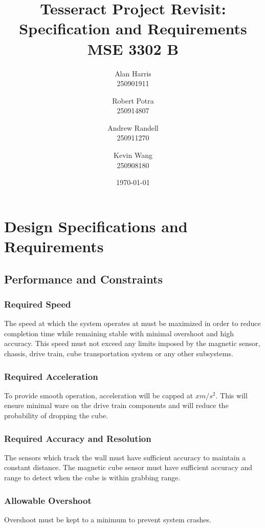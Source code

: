 \documentclass[12pt]{article}
\begin{document}
\title{\textbf{Tesseract Project Revisit:\\Specification and Requirements\\ MSE 3302 B}}
\author{
  Alan Harris\\
  250901911
  \and
  Robert Potra\\
  250914807
  \and
  Andrew Randell\\
  250911270
  \and
  Kevin Wang\\
  250908180
}
\date{\today}
\maketitle

\tableofcontents
\thispagestyle{empty}

\pagebreak
\setcounter{page}{1}
 
\section{Design Specifications and Requirements}
\subsection{Performance and Constraints}
\subsubsection{Required Speed}
The speed at which the system operates at must be maximized in order to reduce completion time while remaining stable with minimal overshoot and high accuracy. This speed must not exceed any limits imposed by the magnetic sensor, chassis, drive train, cube transportation system or any other subsystems.
\subsubsection{Required Acceleration}
To provide smooth operation, acceleration will be capped at $x m/s^2$. This will ensure minimal ware on the drive train components and will reduce the probability of dropping the cube.
\subsubsection{Required Accuracy and Resolution}
The sensors which track the wall must have sufficient accuracy to maintain a constant distance. The magnetic cube sensor must have sufficient accuracy and range to detect when the cube is within grabbing range.
\subsubsection{Allowable Overshoot}
Overshoot must be kept to a minimum to prevent system crashes.
\end{document}
